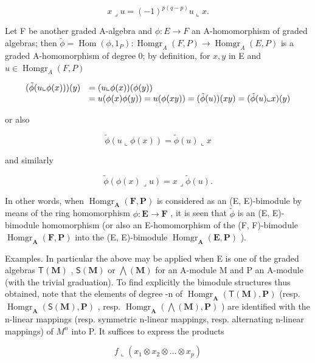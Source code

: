 \[
x \lrcorner u = (- 1) ^ {p (q - p)} u \llcorner x.
\]

Let F be another graded A-algebra and \(\phi: E \to F\) an A-homomorphism of graded algebras; then \(\tilde{\phi} = \operatorname{Hom}(\phi, 1_{P}): \operatorname{Homgr}_{A}(F, P) \to \operatorname{Homgr}_{A}(E, P)\) is a graded A-homomorphism of degree 0; by definition, for \(x, y\) in E and \(u \in \operatorname{Homgr}_{A}(F, P)\)

\[
\begin{array}{r l} (\tilde {\phi} (u \llcorner \phi (x))) (y) & = (u \llcorner \phi (x)) (\phi (y)) \\ & = u (\phi (x) \phi (y)) = u (\phi (x y)) = (\tilde {\phi} (u)) (x y) = (\tilde {\phi} (u) \llcorner x) (y) \end{array}
\]

or also

\[
\tilde {\phi} (u \llcorner \phi (x)) = \tilde {\phi} (u) \llcorner x\tag{42}
\]

and similarly

\[
\tilde {\phi} (\phi (x) \lrcorner u) = x \lrcorner \tilde {\phi} (u).\tag{43}
\]

In other words, when \(\operatorname{Homgr}_{\mathbf{A}}(\mathbf{F}, \mathbf{P})\) is considered as an (E, E)-bimodule by means of the ring homomorphism \(\phi: \mathbf{E} \to \mathbf{F}\) , it is seen that \(\tilde{\phi}\) is an (E, E)-bimodule homomorphism (or also an E-homomorphism of the (F, F)-bimodule \(\operatorname{Homgr}_{\mathbf{A}}(\mathbf{F}, \mathbf{P})\) into the (E, E)-bimodule \(\operatorname{Homgr}_{\mathbf{A}}(\mathbf{E}, \mathbf{P})\) ).

Examples. In particular the above may be applied when E is one of the graded algebras \(\mathsf{T}(\mathbf{M})\) , \(\mathsf{S}(\mathbf{M})\) or \(\bigwedge(\mathbf{M})\) for an A-module M and P an A-module (with the trivial graduation). To find explicitly the bimodule structures thus obtained, note that the elements of degree -n of \(\operatorname{Homgr}_{\mathbf{A}}(\mathsf{T}(\mathbf{M}),\mathbf{P})\) (resp. \(\operatorname{Homgr}_{\mathbf{A}}(\mathsf{S}(\mathbf{M}),\mathbf{P})\) , resp. \(\operatorname{Homgr}_{\mathbf{A}}(\bigwedge(\mathbf{M}),\mathbf{P})\) ) are identified with the n-linear mappings (resp. symmetric n-linear mappings, resp. alternating n-linear mappings) of \(M^{n}\) into P. It suffices to express the products

\[
f \llcorner (x _ {1} \otimes x _ {2} \otimes \dots \otimes x _ {p})
\]

